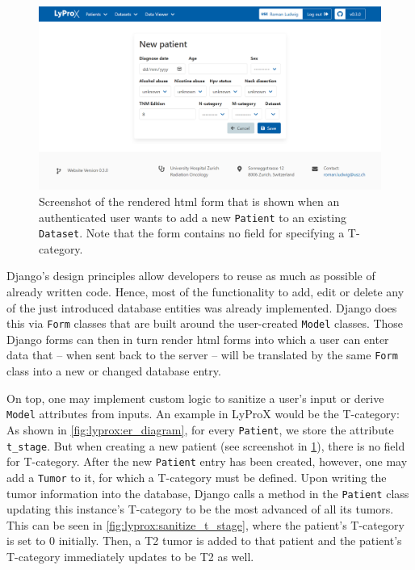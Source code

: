 \documentclass[\relativeRoot/main.tex]{subfiles}
\begin{document}
\begin{figure}
    \centering
    \includegraphics[width=1.0\textwidth, frame]{figures/new_patient.png}
    \caption[
        Screenshot of the form for adding new patients
    ]{
        Screenshot of the rendered \acrshort{html} form that is shown when an authenticated user wants to add a new \texttt{Patient} to an existing \texttt{Dataset}. Note that the form contains no field for specifying a T-category.
    }
    \label{fig:lyprox:new_patient}
\end{figure}

Django's design principles allow developers to reuse as much as possible of already written code. Hence, most of the functionality to add, edit or delete any of the just introduced database entities was already implemented. Django does this via \texttt{Form} classes that are built around the user-created \texttt{Model} classes. Those Django forms can then in turn render \acrshort{html} forms into which a user can enter data that -- when sent back to the server -- will be translated by the same \texttt{Form} class into a new or changed database entry.

On top, one may implement custom logic to sanitize a user's input or derive \texttt{Model} attributes from inputs. An example in LyProX would be the T-category: As shown in \cref{fig:lyprox:er_diagram}, for every \texttt{Patient}, we store the attribute \texttt{t\_stage}. But when creating a new patient (see screenshot in \cref{fig:lyprox:new_patient}), there is no field for T-category. After the new \texttt{Patient} entry has been created, however, one may add a \texttt{Tumor} to it, for which a T-category must be defined. Upon writing the tumor information into the database, Django calls a method in the \texttt{Patient} class updating this instance's T-category to be the most advanced of all its tumors. This can be seen in \cref{fig:lyprox:sanitize_t_stage}, where the patient's T-category is set to 0 initially. Then, a T2 tumor is added to that patient and the patient's T-category immediately updates to be T2 as well.
\end{document}
